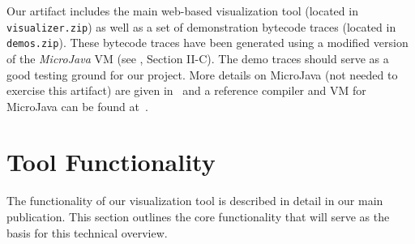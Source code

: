 \documentclass[conference]{IEEEtran}
\begin{document}
Our artifact includes the main web-based visualization tool (located in \texttt{visualizer.zip}) as well as a set of demonstration bytecode traces (located in \texttt{demos.zip}). These bytecode traces have been generated using a modified version of the \emph{MicroJava} VM (see \cite{herber2025}, Section II-C). The demo traces should serve as a good testing ground for our project.
More details on MicroJava (not needed to exercise this artifact) are given in~\cite{moessenboeck2025compiler} and a reference compiler and VM for MicroJava can be found at~\cite{moessenboeckWeb}.

\section{Tool Functionality}

The functionality of our visualization tool is described in detail in our main publication. This section outlines the core functionality that will serve as the basis for this technical overview.
\end{document}
